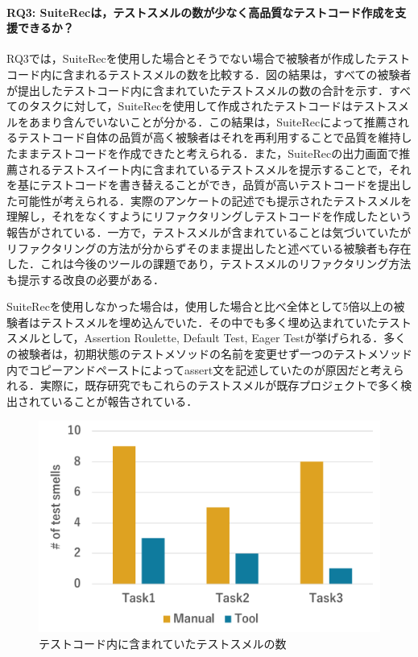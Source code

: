 \documentclass[12pt]{jarticle} %
\begin{document}
\paragraph{RQ3: {\sf SuiteRec}は，テストスメルの数が少なく高品質なテストコード作成を支援できるか？}RQ3では，{\sf SuiteRec}を使用した場合とそうでない場合で被験者が作成したテストコード内に含まれるテストスメルの数を比較する．図の結果は，すべての被験者が提出したテストコード内に含まれていたテストスメルの数の合計を示す．すべてのタスクに対して，{\sf SuiteRec}を使用して作成されたテストコードはテストスメルをあまり含んでいないことが分かる．この結果は，{\sf SuiteRec}によって推薦されるテストコード自体の品質が高く被験者はそれを再利用することで品質を維持したままテストコードを作成できたと考えられる．また，{\sf SuiteRec}の出力画面で推薦されるテストスイート内に含まれているテストスメルを提示することで，それを基にテストコードを書き替えることができ，品質が高いテストコードを提出した可能性が考えられる．実際のアンケートの記述でも提示されたテストスメルを理解し，それをなくすようにリファクタリングしテストコードを作成したという報告がされている．一方で，テストスメルが含まれていることは気づいていたがリファクタリングの方法が分からずそのまま提出したと述べている被験者も存在した．これは今後のツールの課題であり，テストスメルのリファクタリング方法も提示する改良の必要がある．

{\sf SuiteRec}を使用しなかった場合は，使用した場合と比べ全体として5倍以上の被験者はテストスメルを埋め込んでいた．その中でも多く埋め込まれていたテストスメルとして，Assertion Roulette, Default Test, Eager Testが挙げられる．多くの被験者は，初期状態のテストメソッドの名前を変更せず一つのテストメソッド内でコピーアンドペーストによってassert文を記述していたのが原因だと考えられる．実際に，既存研究でもこれらのテストスメルが既存プロジェクトで多く検出されていることが報告されている\cite{b9}．

\begin{figure}[htbp]
  \begin{center}
   \includegraphics[width=12cm]{smells.pdf}
  \caption{テストコード内に含まれていたテストスメルの数}
  \label{smell}
  \end{center}
\end{figure}
\end{document}

